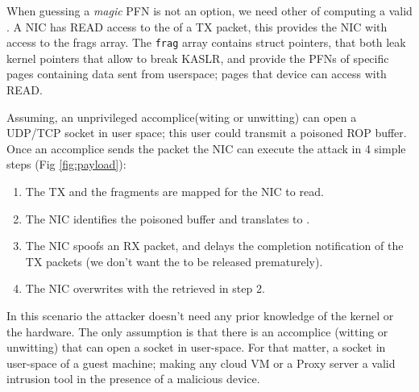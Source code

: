When guessing a \emph{magic} PFN is not an option, we need other \means of computing a valid \kva. 
A NIC has READ access to the \shinfo of a TX packet, this provides the NIC with access to the frags array. The \texttt{frag} array contains struct \page{} pointers, that both leak kernel pointers that allow to break KASLR, and provide the PFNs of specific pages containing data sent from userspace; pages that device can access with READ. 

Assuming, an unprivileged accomplice(witing or unwitting) can open a UDP/TCP socket in user space; this user could transmit a poisoned ROP buffer. 
Once an accomplice sends the packet the NIC can execute the attack in 4 simple steps (Fig \ref{fig:payload}):
\begin{enumerate}
    \item The TX \data and the fragments are mapped for the NIC to read.
    \item The NIC identifies the poisoned buffer and translates \page to \kva.
    \item The NIC spoofs an RX packet, and delays the completion notification of the TX packets (we don't want the \mabaf to be released prematurely).
    \item The NIC overwrites \shinfo with the \kva retrieved in step 2. 
\end{enumerate}
In this scenario the attacker doesn't need any prior knowledge of the kernel or the hardware. The only assumption is that there is an accomplice (witting or unwitting) that can open a socket in user-space. For that matter, a socket in user-space of a guest machine; making any cloud VM or a Proxy server a valid intrusion tool in the presence of a malicious device.\newline
